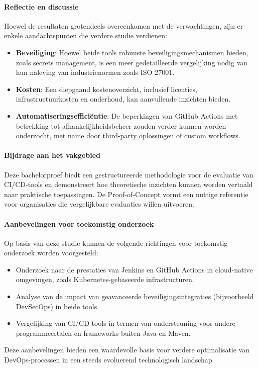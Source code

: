 \paragraph{Reflectie en discussie}
Hoewel de resultaten grotendeels overeenkomen met de verwachtingen, zijn er enkele aandachtspunten die verdere studie verdienen:
\begin{itemize}
    \item \textbf{Beveiliging}: Hoewel beide tools robuuste beveiligingsmechanismen bieden, zoals secrets management, is een meer gedetailleerde vergelijking nodig van hun naleving van industrienormen zoals ISO 27001.
    \item \textbf{Kosten}: Een diepgaand kostenoverzicht, inclusief licenties, infrastructuurkosten en onderhoud, kan aanvullende inzichten bieden.
    \item \textbf{Automatiseringsefficiëntie}: De beperkingen van GitHub Actions met betrekking tot afhankelijkheidsbeheer zouden verder kunnen worden onderzocht, met name door third-party oplossingen of custom workflows.
\end{itemize}

\paragraph{Bijdrage aan het vakgebied}
Deze bachelorproef biedt een gestructureerde methodologie voor de evaluatie van CI/CD-tools en demonstreert hoe theoretische inzichten kunnen worden vertaald naar praktische toepassingen. De Proof-of-Concept vormt een nuttige referentie voor organisaties die vergelijkbare evaluaties willen uitvoeren.

\paragraph{Aanbevelingen voor toekomstig onderzoek}
Op basis van deze studie kunnen de volgende richtingen voor toekomstig onderzoek worden voorgesteld:
\begin{itemize}
    \item Onderzoek naar de prestaties van Jenkins en GitHub Actions in cloud-native omgevingen, zoals Kubernetes-gebaseerde infrastructuren.
    \item Analyse van de impact van geavanceerde beveiligingsintegraties (bijvoorbeeld DevSecOps) in beide tools.
    \item Vergelijking van CI/CD-tools in termen van ondersteuning voor andere programmeertalen en frameworks buiten Java en Maven.
\end{itemize}

Deze aanbevelingen bieden een waardevolle basis voor verdere optimalisatie van DevOps-processen in een steeds evoluerend technologisch landschap.


